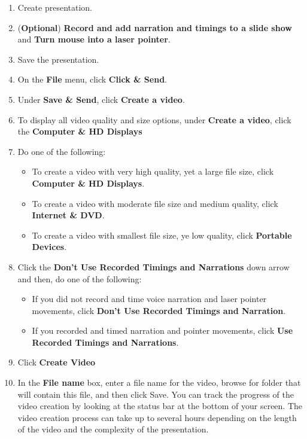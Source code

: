 \documentclass[10pt,a4paper]{article}
\begin{document}
\begin{enumerate}
\item Create presentation.
\item (\textbf{Optional}) \textbf{Record and add narration and timings to a slide show} and \textbf{Turn mouse into a laser pointer}.
\item Save the presentation.
\item On the \textbf{File} menu, click \textbf{Click \& Send}.
\item Under \textbf{Save \& Send}, click \textbf{Create a video}.
\item To display all video quality and size options, under \textbf{Create a video}, click the \textbf{Computer \& HD Displays}
\item Do one of the following:
\begin{itemize}
\item To create a video with very high quality, yet a large file size, click \textbf{Computer \& HD Displays}.
\item To create a video with moderate file size and medium quality, click \textbf{Internet \& DVD}.
\item To create a video with smallest file size, ye low quality, click \textbf{Portable Devices}.
\end{itemize}
\item Click the \textbf{Don't Use Recorded Timings and Narrations} down arrow and then, do one of the following:
\begin{itemize}
\item If you did not record and time voice narration and laser pointer movements, click \textbf{Don't Use Recorded Timings and Narration}.
\item If you recorded and timed narration and pointer movements, click \textbf{Use Recorded Timings and Narrations}.
\end{itemize}
\item Click \textbf{Create Video}
\item In the \textbf{File name} box, enter a file name for the video, browse for folder that will contain this file, and then click Save. You can track the progress of the video creation by looking at the status bar at the bottom of your screen. The video creation process can take up to several hours depending on the length of the video and the complexity of the presentation.
\end{enumerate}
\end{document}
